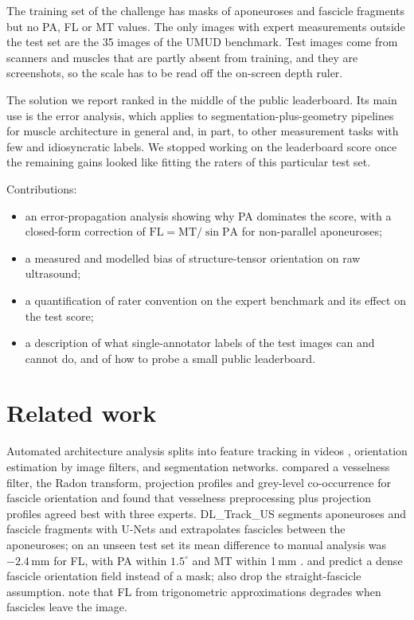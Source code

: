 \documentclass[11pt,a4paper]{article}
\newcommand{\PA}{\mathrm{PA}}
\newcommand{\FL}{\mathrm{FL}}
\newcommand{\MT}{\mathrm{MT}}
\begin{document}
The training set of the challenge has masks of aponeuroses and fascicle fragments but no PA, FL or MT values. The only images with expert measurements outside the test set are the 35 images of the UMUD benchmark. Test images come from scanners and muscles that are partly absent from training, and they are screenshots, so the scale has to be read off the on-screen depth ruler.

The solution we report ranked in the middle of the public leaderboard. Its main use is the error analysis, which applies to segmentation-plus-geometry pipelines for muscle architecture in general and, in part, to other measurement tasks with few and idiosyncratic labels. We stopped working on the leaderboard score once the remaining gains looked like fitting the raters of this particular test set.

Contributions:
\begin{itemize}
\item an error-propagation analysis showing why PA dominates the score, with a closed-form correction of $\FL=\MT/\sin\PA$ for non-parallel aponeuroses;
\item a measured and modelled bias of structure-tensor orientation on raw ultrasound;
\item a quantification of rater convention on the expert benchmark and its effect on the test score;
\item a description of what single-annotator labels of the test images can and cannot do, and of how to probe a small public leaderboard.
\end{itemize}

\section{Related work}

Automated architecture analysis splits into feature tracking in videos \citep{farris2016ultratrack}, orientation estimation by image filters, and segmentation networks. \citet{pohle2020orientation} compared a vesselness filter, the Radon transform, projection profiles and grey-level co-occurrence for fascicle orientation and found that vesselness preprocessing plus projection profiles agreed best with three experts. DL\_Track\_US segments aponeuroses and fascicle fragments with U-Nets and extrapolates fascicles between the aponeuroses; on an unseen test set its mean difference to manual analysis was $-2.4$\,mm for FL, with PA within $1.5^\circ$ and MT within 1\,mm \citep{ritsche2023dltrack}. \citet{michard2021awnet} and \citet{yuan2024nonlinear} predict a dense fascicle orientation field instead of a mask; \citeauthor{yuan2024nonlinear} also drop the straight-fascicle assumption. \citet{katakis2022attention} note that FL from trigonometric approximations degrades when fascicles leave the image.
\end{document}
